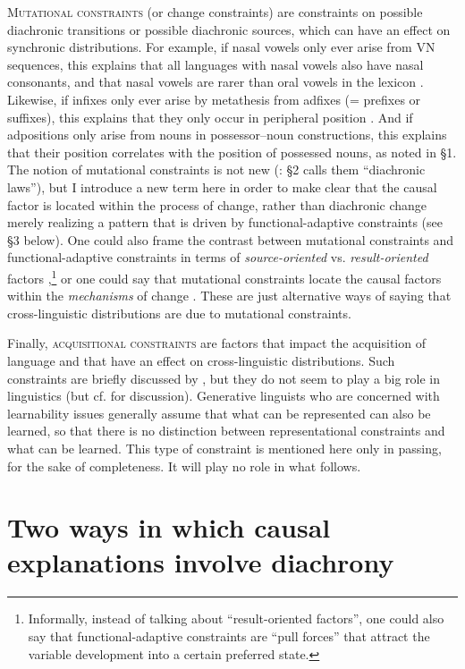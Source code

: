 \documentclass[output=paper]{langsci/langscibook}
\begin{document}
\textsc{Mutational constraints} (or change constraints) are constraints on possible diachronic transitions or possible diachronic sources, which can have an effect on synchronic distributions. For example, if nasal vowels only ever arise from VN sequences, this explains that all languages with nasal vowels also have nasal consonants, and that nasal vowels are rarer than oral vowels in the lexicon \citep{Greenberg1978_Diachr}. Likewise, if infixes only ever arise by metathesis from adfixes (= prefixes or suffixes), this explains that they only occur in peripheral position \citep[51]{Plank2007}. And if adpositions only arise from nouns in possessor–noun constructions, this explains that their position correlates with the position of possessed nouns, as noted in §1. The notion of mutational constraints is not new (\citealt{Plank2007}: §2 calls them “diachronic laws”), but I introduce a new term here in order to make clear that the causal factor is located within the process of change, rather than diachronic change merely realizing a pattern that is driven by functional-adaptive constraints (see §3 below). One could also frame the contrast between mutational constraints and functional-adaptive constraints in terms of \textit{source-oriented} vs. \textit{result-oriented} factors \citep{Cristofaro2017},\footnote{Informally, instead of talking about “result-oriented factors”, one could also say that functional-adaptive constraints are “pull forces” that attract the variable development into a certain preferred state.} or one could say that mutational constraints locate the causal factors within the \textit{mechanisms} of change \citep{Bybee2006}. These are just alternative ways of saying that cross-linguistic distributions are due to mutational constraints.

Finally, \textsc{acquisitional constraints} are factors that impact the acquisition of language and that have an effect on cross-linguistic distributions. Such constraints are briefly discussed by \citet{Anderson2016}, but they do not seem to play a big role in linguistics (but cf.  for discussion). Generative linguists who are concerned with learnability issues generally assume that what can be represented can also be learned, so that there is no distinction between representational constraints and what can be learned. This type of constraint is mentioned here only in passing, for the sake of completeness. It will play no role in what follows.

\section{Two ways in which causal explanations involve diachrony}\label{sec:haspelmath:3}
\end{document}
